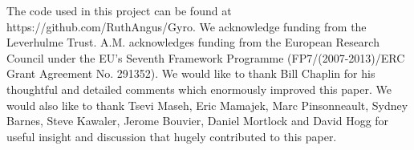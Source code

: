 \documentclass[useAMS, usenatbib]{mn2e}
\begin{document}
The code used in this project can be found at
https://github.com/RuthAngus/Gyro.
We acknowledge funding from the Leverhulme Trust.
A.M. acknowledges funding from the European Research Council under the EU’s
Seventh Framework Programme (FP7/(2007-2013)/ERC Grant Agreement No. 291352).
We would like to thank Bill Chaplin for his thoughtful and detailed comments
which enormously improved this paper.
We would also like to thank Tsevi Maseh, Eric Mamajek, Marc Pinsonneault,
Sydney Barnes, Steve Kawaler, Jerome Bouvier, Daniel Mortlock and David Hogg
for useful insight and discussion that hugely contributed to this paper.



\end{document}
